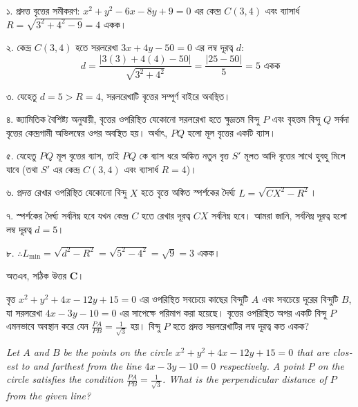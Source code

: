 \documentclass[12pt, a4paper]{article}
\begin{document}
\begin{tcolorbox}[solutionbox={সমাধান (Solution)}]
    \noindent
    ১. প্রদত্ত বৃত্তের সমীকরণ: $x^2 + y^2 - 6x - 8y + 9 = 0$ এর কেন্দ্র $C(3, 4)$ এবং ব্যাসার্ধ $R = \sqrt{3^2 + 4^2 - 9} = 4$ একক। 
    
    ২. কেন্দ্র $C(3, 4)$ হতে সরলরেখা $3x + 4y - 50 = 0$ এর লম্ব দূরত্ব $d$: 
    \[ d = \frac{|3(3) + 4(4) - 50|}{\sqrt{3^2 + 4^2}} = \frac{|25 - 50|}{5} = 5 \text{ একক} \]
    
    ৩. যেহেতু $d = 5 > R = 4$, সরলরেখাটি বৃত্তের সম্পূর্ণ বাইরে অবস্থিত। 
    
    ৪. জ্যামিতিক বৈশিষ্ট্য অনুযায়ী, বৃত্তের ওপরিস্থিত যেকোনো সরলরেখা হতে ক্ষুদ্রতম বিন্দু $P$ এবং বৃহত্তম বিন্দু $Q$ সর্বদা বৃত্তের কেন্দ্রগামী অভিলম্বের ওপর অবস্থিত হয়। অর্থাৎ, $PQ$ হলো মূল বৃত্তের একটি ব্যাস। 
    
    ৫. যেহেতু $PQ$ মূল বৃত্তের ব্যাস, তাই $PQ$ কে ব্যাস ধরে অঙ্কিত নতুন বৃত্ত $S'$ মূলত আদি বৃত্তের সাথে হুবহু মিলে যাবে (তথা $S'$ এর কেন্দ্র $C(3, 4)$ এবং ব্যাসার্ধ $R = 4$)। 
    
    ৬. প্রদত্ত রেখার ওপরিস্থিত যেকোনো বিন্দু $X$ হতে বৃত্তে অঙ্কিত স্পর্শকের দৈর্ঘ্য $L = \sqrt{CX^2 - R^2}$। 
    
    ৭. স্পর্শকের দৈর্ঘ্য সর্বনিম্ন হবে যখন কেন্দ্র $C$ হতে রেখার দূরত্ব $CX$ সর্বনিম্ন হবে। আমরা জানি, সর্বনিম্ন দূরত্ব হলো লম্ব দূরত্ব $d = 5$। 
    
    ৮. $\therefore L_{\min} = \sqrt{d^2 - R^2} = \sqrt{5^2 - 4^2} = \sqrt{9} = 3$ একক। 
    
    অতএব, সঠিক উত্তর \textbf{C}।
\end{tcolorbox}

\vspace{2em}

\begin{tcolorbox}[questionbox={প্রশ্ন (Question) 42}]
    \noindent
    বৃত্ত $x^2 + y^2 + 4x - 12y + 15 = 0$ এর ওপরিস্থিত সবচেয়ে কাছের বিন্দুটি $A$ এবং সবচেয়ে দূরের বিন্দুটি $B$, যা সরলরেখা $4x - 3y - 10 = 0$ এর সাপেক্ষে পরিমাপ করা হয়েছে। বৃত্তের ওপরিস্থিত অপর একটি বিন্দু $P$ এমনভাবে অবস্থান করে যেন $\frac{PA}{PB} = \frac{1}{\sqrt{3}}$ হয়। বিন্দু $P$ হতে প্রদত্ত সরলরেখাটির লম্ব দূরত্ব কত একক?
    
    \vspace{0.8em}
    \begin{english}
    \noindent\textit{\color{darkgray}
    Let $A$ and $B$ be the points on the circle $x^2 + y^2 + 4x - 12y + 15 = 0$ that are closest to and farthest from the line $4x - 3y - 10 = 0$ respectively. A point $P$ on the circle satisfies the condition $\frac{PA}{PB} = \frac{1}{\sqrt{3}}$. What is the perpendicular distance of $P$ from the given line?
    }
    \end{english}
\end{tcolorbox}
\end{document}
